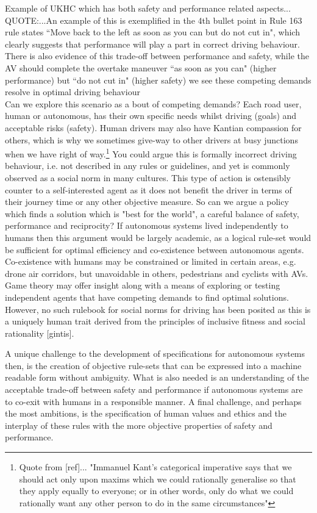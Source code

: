 \documentclass[sigconf]{acmart}
\begin{document}
Example of UKHC which has both safety and performance related aspects...
\\
QUOTE:...An example of this is exemplified in the 4th bullet point in Rule 163 rule states ``Move back to the left as soon as you can but do not cut in", which clearly suggests that performance will play a part in correct driving behaviour. There is also evidence of this trade-off between performance and safety, while the AV should complete the overtake maneuver ``as soon as you can" (higher performance) but ``do not cut in" (higher safety) we see these competing demands resolve in optimal driving behaviour
\\

Can we explore this scenario as a bout of competing demands? Each road user, human or autonomous, has their own specific needs whilst driving (goals) and acceptable risks (safety). 
%
Human drivers may also have Kantian compassion for others, which is why we sometimes give-way to other drivers at busy junctions when we have right of way.\footnote{Quote from [ref]... "Immanuel Kant’s categorical imperative says that we should act only upon maxims which we could rationally generalise so that they apply equally to everyone; or in other words, only do what we could rationally want any other person to do in the same circumstances"} 
%
You could argue this is formally incorrect driving behaviour, i.e. not described in any rules or guidelines, and yet is commonly observed as a social norm in many cultures. This type of action is ostensibly counter to a self-interested agent as it does not benefit the driver in terms of their journey time or any other objective measure. 
%
So can we argue a policy which finds a solution which is "best for the world", a careful balance of safety, performance and reciprocity? 
%
If autonomous systems lived independently to humans then this argument would be largely academic, as a logical rule-set would be sufficient for optimal efficiency and co-existence between autonomous agents. 
%
Co-existence with humans may be constrained or limited in certain areas, e.g. drone air corridors, but unavoidable in others, pedestrians and cyclists with AVs.
%
Game theory may offer insight along with a means of exploring or testing independent agents that have competing demands to find optimal solutions. 
%
However, no such rulebook for social norms for driving has been posited as this is a uniquely human trait derived from the principles of inclusive  fitness and social rationality [gintis].

A unique challenge to the development of specifications for autonomous systems then, is the creation of objective rule-sets that can be expressed into a machine readable form without ambiguity. What is also needed is an understanding of the acceptable trade-off between safety and performance if autonomous systems are to co-exit with humans in a responsible manner. 
%
A final challenge, and perhaps the most ambitions, is the specification of human values and ethics and the interplay of these rules with the more objective properties of safety and performance.
\end{document}
